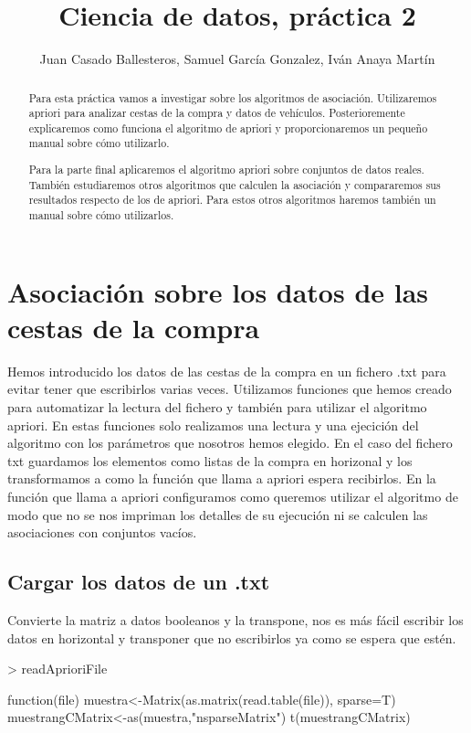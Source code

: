 \documentclass [a4paper] {article}
\title{Ciencia de datos, práctica 2}
\author{Juan Casado Ballesteros, Samuel García Gonzalez, Iván Anaya Martín}
\begin{document}
\maketitle

\begin{abstract}
Para esta práctica vamos a investigar sobre los algoritmos de asociación.
Utilizaremos apriori para analizar cestas de la compra y datos de vehículos.
Posterioremente explicaremos como funciona el algoritmo de apriori y proporcionaremos un pequeño manual sobre cómo utilizarlo.

Para la parte final aplicaremos el algoritmo apriori sobre conjuntos de datos reales.
También estudiaremos otros algoritmos que calculen la asociación y compararemos sus resultados respecto de los de apriori.
Para estos otros algoritmos haremos también un manual sobre cómo utilizarlos.
\end{abstract}

\newpage
\tableofcontents
\newpage


\section{Asociación sobre los datos de las cestas de la compra}
Hemos introducido los datos de las cestas de la compra en un fichero .txt para evitar tener que escribirlos varias veces.
Utilizamos funciones que hemos creado para automatizar la lectura del fichero y también para utilizar el algoritmo apriori.
En estas funciones solo realizamos una lectura y una ejecición del algoritmo con los parámetros que nosotros hemos elegido.
En el caso del fichero txt guardamos los elementos como listas de la compra en horizonal y los transformamos a como la función que llama a apriori espera recibirlos.
En la función que llama a apriori configuramos como queremos utilizar el algoritmo de modo que no se nos impriman los detalles de su ejecución
ni se calculen las asociaciones con conjuntos vacíos.

\subsection{Cargar los datos de un .txt}
Convierte la matriz a datos booleanos y la transpone, nos es más fácil escribir los datos en horizontal y transponer que no escribirlos ya como se espera que estén.
\begin{Schunk}
\begin{Sinput}
> readAprioriFile
\end{Sinput}
\begin{Soutput}
function(file){
  muestra<-Matrix(as.matrix(read.table(file)), sparse=T)
  muestrangCMatrix<-as(muestra,"nsparseMatrix")
  t(muestrangCMatrix)
}
\end{Soutput}
\end{Schunk}
\end{document}

